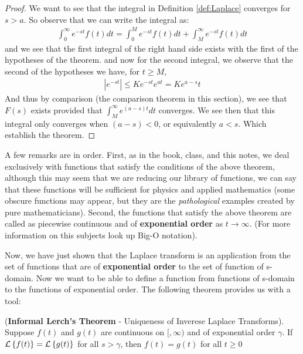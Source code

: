 \begin{proof}
	We want to see that the integral in Definition \ref{def:Laplace} converges for $ s > a$. So observe that we can write the integral as:
	\begin{align}
	\int_0^\infty e^{-st}f(t)dt = \int_0^M e^{-st}f(t)dt + \int_M^\infty e^{-st}f(t)dt
	\end{align}
	and we see that the first integral of the right hand side exists with the first of the hypotheses of the theorem. and now for the second integral, we observe that the second of the hypotheses we have, for $t \geq M$,
	\begin{align*}
	|e^{-st}| \leq Ke^{-st}e^{at} = Ke^{a-s}t
	\end{align*}
	And thus by comparison (the comparison theorem in this section), we see that $F(s)$ exists provided that $ \int_M^{\infty} e^{(a-s)t} dt $ converges. We see then that this integral only converges when $ (a-s) < 0$, or equivalently $a<s$. Which establish the theorem.
\end{proof}
A few remarks are in order. First, as in the book, class, and this notes, we deal exclusively with functions that satisfy the conditions of the above theorem, although this may seem that we are reducing our library of functions, we can say that these functions will be sufficient for physics and applied mathematics (some obscure functions may appear, but they are the \emph{pathological} examples created by pure mathematicians). Second, the functions that satisfy the above theorem are called as piecewise continuous and of \textbf{exponential order} as $ t \rightarrow \infty$. (For more information on this subjects look up Big-O notation).

Now, we have just shown that the Laplace transform is an application from the set of functions that are of \textbf{exponential order} to  the set of function of s-domain. Now we want to be able to define a function from functions of s-domain to the functions of exponential order. The following theorem provides us with a tool:

\begin{thm}
	(\textbf{Informal Lerch's Theorem} - Uniqueness of Inverese Laplace Transforms). Suppose $f(t)$ and $g(t)$ are continuous on $ [, \infty)$ and of exponential order $ \gamma$. If $ \mathcal{L}\left\lbrace f(t) \right\rbrace = \mathcal{L}\left\lbrace g(t) \right\rbrace $ for all  $s > \gamma$, then $f(t) = g(t)$ for all $ t \geq 0$
\end{thm}

